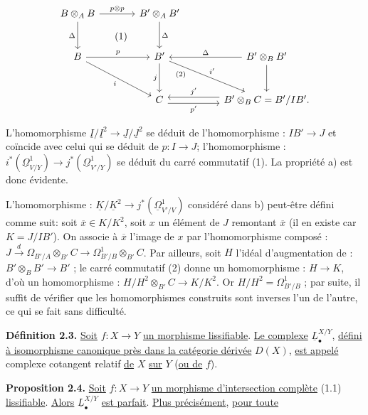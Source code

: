 
\[
\begin{tikzcd}[column sep=large,row sep=large]
B\otimes_A B \arrow[r,"p\otimes p"] \arrow[d,"\Delta"'] \arrow[dr,phantom,"(1)"] & B'\otimes_A B' \arrow[d,"\Delta"]\\
B \arrow[r,"p"] \arrow[dr,"i"'] & B' \arrow[d,"j"'] \arrow[dr,"i'","(2)"' near start] & B'\otimes_B B' \arrow[l,"\Delta"'] \arrow[d]\\
{} & C \arrow[r,shift right=.7ex,"p'"'] & B'\otimes_B C = B'/IB'. \arrow[l,shift right=.7ex,"j'"']
\end{tikzcd}
\]

L'homomorphisme $\underline{I}/\underline{I}^2\to\underline{J}/\underline{J}^2$ se déduit de l'homomorphisme : $IB'\to J$ et coïncide avec celui qui se déduit de $p:I\to J$; l'homomorphisme : $i^*(\underline{\Omega}^1_{V/Y})\longrightarrow j^*(\underline{\Omega}^1_{V'/Y})$ se déduit du carré commutatif (1). La propriété a) est donc évidente.

L'homomorphisme : $\underline{K}/\underline{K}^2\to j^*(\underline{\Omega}^1_{V'/V})$ considéré dans b) peut-être défini comme suit: soit $\overline x\in K/K^2$, soit $x$ un élément de $J$ remontant $\overline x$ (il en existe car $K=J/IB'$). On associe à $\overline x$ l'image de $x$ par l'homomorphisme composé : $J\xrightarrow{d}\Omega_{B'/A}\otimes_{B'}C\longrightarrow\Omega^1_{B'/B}\otimes_{B'}C$. Par ailleurs, soit $H$ l'idéal d'augmentation de : $B'\otimes_B B'\longrightarrow B'$ ; le carré commutatif (2) donne un homomorphisme : $H\to K$, d'où un homomorphisme : $H/H^2\otimes_{B'}C\longrightarrow K/K^2$. Or $H/H^2=\Omega^1_{B'/B}$ ; par suite, il suffit de vérifier que les homomorphismes construits sont inverses l'un de l'autre, ce qui se fait sans difficulté.

\textbf{Définition 2.3.} \uline{Soit} $f:X\to Y$ \uline{un morphisme lissifiable}. \uline{Le complexe} $\underline{L}^{X/Y}_\bullet$, \uline{défini à isomorphisme canonique près dans la catégorie dérivée} $D(X)$, \uline{est appelé} complexe cotangent relatif \uline{de} $X$ \uline{sur} $Y$ (\uline{ou de} $f$).

\textbf{Proposition 2.4.} \uline{Soit} $f:X\to Y$ \uline{un morphisme d'intersection complète} (1.1) \uline{lissifiable}. \uline{Alors} $\underline{L}^{X/Y}_\bullet$ \uline{est parfait}. \uline{Plus précisément}, \uline{pour toute}

